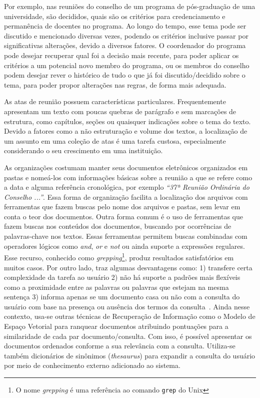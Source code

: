 Por exemplo, nas reuniões do conselho de um programa de pós-graduação de uma universidade, são decididos, quais são os critérios para credenciamento e permanência de docentes no programa. Ao longo do tempo, esse tema pode ser discutido e mencionado diversas vezes, podendo os critérios inclusive passar por significativas alterações, devido a diversos fatores. O coordenador do programa pode desejar recuperar qual foi a decisão mais recente, para poder aplicar os critérios a um potencial novo membro do programa, ou os membros do conselho podem desejar rever o histórico de tudo o que já foi discutido/decidido sobre o tema, para poder propor alterações nas regras, de forma mais adequada.

As atas de reunião possuem características particulares. Frequentemente apresentam um texto com poucas quebras de parágrafo e sem marcações de estrutura, como capítulos, seções ou quaisquer indicações sobre o tema do texto. Devido a fatores como a não estruturação e volume dos textos, a localização de um assunto em uma coleção de atas é uma tarefa custosa, especialmente considerando o seu crescimento em uma instituição. 


As organizações costumam manter seus documentos eletrônicos organizados em pastas e nomeá-los com informações básicas sobre a reunião a que se refere como a data e alguma referência cronológica, por exemplo \textit{``37ª Reunião Ordinária do Conselho ...''}. Essa forma de organização facilita a localização dos arquivos com ferramentas que fazem buscas pelo nome dos arquivos e pastas, sem levar em conta o teor dos documentos. 
%
Outra forma comum é o uso de ferramentas que fazem buscas nos conteúdos dos documentos, buscando por ocorrências de palavras-chave nos textos. Essas ferramentas permitem buscas combinadas com operadores lógicos como \textit{and}, \textit{or} e \textit{not} ou ainda suporte a expressões regulares. Esse recurso, conhecido como \textit{grepping}\footnote{O nome \textit{grepping} é uma referência ao comando \texttt{grep} do Unix}, produz resultados satisfatórios em muitos casos. Por outro lado, traz algumas desvantagens como: 
1) transfere certa complexidade da tarefa ao usuário 
2) não há suporte a padrões mais flexíveis como a proximidade entre as palavras ou palavras que estejam na mesma sentença 
3) informa apenas se um documento casa ou não com a consulta do usuário com base na presença ou ausência dos termos da consulta~\cite{Aggarwal2012,Manning2008}. 
% 
Ainda nesse contexto, usa-se outras técnicas de Recuperação de Informação como o Modelo de Espaço Vetorial para ranquear documentos atribuindo pontuações para a similaridade de cada par documento/consulta. Com isso, é possível apresentar os documentos ordenados conforme a sua relevância com a consulta. Utiliza-se também dicionários de sinônimos (\textit{thesaurus}) para expandir a consulta do usuário por meio de conhecimento externo adicionado ao sistema. %

